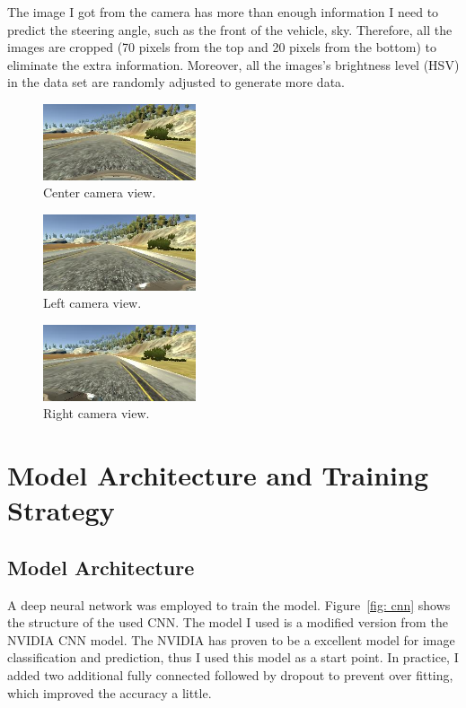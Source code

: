 \documentclass{article}
\begin{document}
The image I got from the camera has more than enough information I need to predict the steering angle, such as the front of the vehicle, sky. Therefore, all the images are cropped (70 pixels from the top and 20 pixels from the bottom) to eliminate the extra information. Moreover, all the images's brightness level (HSV) in the data set are randomly adjusted to generate more data. 


\begin{figure}[!ht]
\centering
\includegraphics[width=0.4\textwidth]{center.JPG}
\caption{Center camera view.}
\label{fig: center}
\end{figure}
\begin{figure}[!ht]
\centering
\includegraphics[width=0.4\textwidth]{left.JPG}
\caption{Left camera view.}
\label{fig: left}
\end{figure}
\begin{figure}[H]
\centering
\includegraphics[width=0.4\textwidth]{right.JPG}
\caption{Right camera view.}
\label{fig: right}
\end{figure}

\section{Model Architecture and Training Strategy}
\subsection{Model Architecture}

A deep neural network was employed to train the model. Figure~\ref{fig: cnn} shows the structure of the used CNN. The model I used is a modified version from the NVIDIA CNN model. The NVIDIA has proven to be a excellent model for image classification and prediction, thus I used this model as a start point. In practice, I added two additional fully connected followed by dropout to prevent over fitting, which improved the accuracy a little. 
\end{document}
